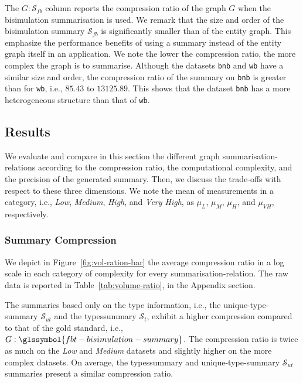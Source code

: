 The $G:\mathcal{S}_{fb}$ column reports the compression ratio of the graph $G$ when the bisimulation summarisation is used. We remark that the size and order of the bisimulation summary $\mathcal{S}_{fb}$ is significantly smaller than of the entity graph. This emphasize the performance benefits of using a summary instead of the entity graph itself in an application. We note the lower the compression ratio, the more complex the graph is to summarise. Although the datasets \texttt{bnb} and \texttt{wb} have a similar size and order, the compression ratio of the summary on \texttt{bnb} is greater than for \texttt{wb}, i.e., $85.43$ to $13125.89$. This shows that the dataset \texttt{bnb} has a more heterogeneous structure than that of \texttt{wb}.



\subsection{Results}
\label{chap5:precision:eval:results}

We evaluate and compare in this section the different graph \glspl{summarisation-relation} according to the compression ratio, the computational complexity, and the precision of the generated summary. Then, we discuss the trade-offs with respect to these three dimensions.
We note the mean of measurements in a category, i.e., \emph{Low}, \emph{Medium}, \emph{High}, and \emph{Very High}, as $\mu_{L}$, $\mu_{M}$, $\mu_{H}$, and $\mu_{VH}$, respectively.

\subsubsection{Summary Compression}

We depict in Figure~\ref{fig:vol-ration-bar} the average compression ratio in a log scale in each category of complexity for every \gls{summarisation-relation}. The raw data is reported in Table~\ref{tab:volume-ratio}, in the Appendix section.

The summaries based only on the type information, i.e., the \gls{unique-type-summary} $\mathcal{S}_{ut}$ and the \gls{typessummary} $\mathcal{S}_t$, exhibit a higher compression compared to that of the gold standard, i.e., $G:\glssymbol{fbt-bisimulation-summary}$. The compression ratio is twice as much on the \emph{Low} and \emph{Medium} datasets and slightly higher on the more complex datasets. On average, the \gls{typessummary} and  \gls{unique-type-summary} $\mathcal{S}_{ut}$ summaries present a similar compression ratio.

